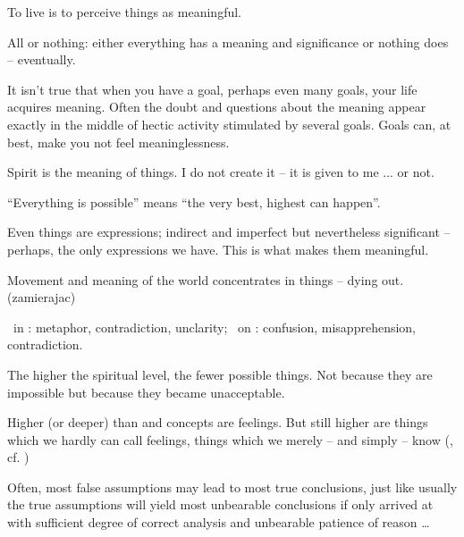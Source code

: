 
\pa
To live is to perceive things as meaningful.

\pa
All or nothing: either everything has a meaning and significance or nothing does -- 
eventually.

\pa
It isn't true that when you have a goal, perhaps even many goals, your life
acquires meaning. Often the doubt and questions about the meaning appear exactly
in the middle of hectic activity stimulated by several goals. Goals can, at best,
make you not feel meaninglessness.

\pa
Spirit is the meaning of things. I do not create it -- it is given to me ... or not.

\pa
``Everything is possible'' means ``the very best, highest can happen''.

\pa
Even things are expressions; indirect and imperfect but nevertheless
significant -- perhaps, the only expressions we have. This is what makes them meaningful.

\pa
Movement and meaning of the world concentrates in things -- dying out. (zamieraj{a}c)


\pa
\HH\ in \LL: metaphor, contradiction, unclarity; \LL\ on \HH: confusion, 
misapprehension, contradiction.

\pa
The higher the spiritual level, the fewer possible things. Not because they 
are impossible but because they became unacceptable.

\pa\label{qpa:in}
Higher (or deeper) than  and concepts are feelings. But still
higher are things which we hardly can call feelings, things which we merely
-- and simply -- know (, cf. )




\pa
Often, most false assumptions may lead to most true conclusions, just 
like usually the true assumptions will yield most unbearable 
conclusions if only arrived at with sufficient degree of correct 
analysis and unbearable patience of reason \ldots 

